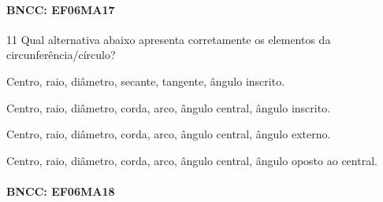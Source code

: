 \paragraph{BNCC: EF06MA17 }


\num{11} Qual alternativa abaixo apresenta corretamente os elementos da
circunferência/círculo?

\begin{escolha}
\item Centro, raio, diâmetro, secante, tangente, ângulo inscrito.
\item Centro, raio, diâmetro, corda, arco, ângulo central, ângulo inscrito.
\item Centro, raio, diâmetro, corda, arco, ângulo central, ângulo externo.
\item Centro, raio, diâmetro, corda, arco, ângulo central, ângulo oposto ao
central.
\end{escolha}

\paragraph{BNCC: EF06MA18 }


